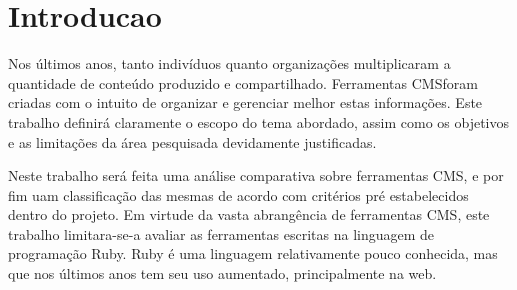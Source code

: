 \chapter{Introducao}

Nos últimos anos, tanto indivíduos quanto organizações multiplicaram a quantidade de conteúdo produzido e compartilhado. Ferramentas CMSforam criadas com o intuito de organizar e gerenciar melhor estas informações. Este trabalho definirá claramente o escopo do tema abordado, assim como os objetivos e as limitações da área pesquisada devidamente justificadas.

Neste trabalho será feita uma análise comparativa sobre ferramentas CMS, e por fim uam classificação das mesmas de acordo com critérios pré estabelecidos dentro do projeto. Em virtude da vasta abrangência de ferramentas CMS, este trabalho limitara-se-a avaliar as ferramentas escritas  na linguagem de programação Ruby. Ruby é uma linguagem relativamente pouco conhecida, mas que nos últimos anos tem seu uso aumentado, principalmente na web. 



